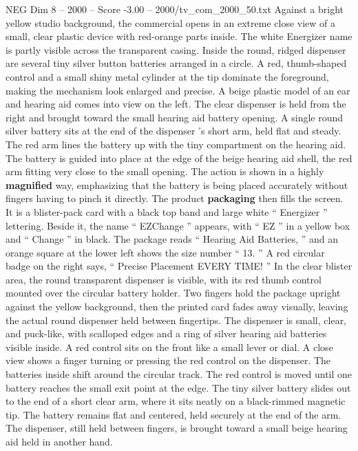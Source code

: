 \begin{textsample}{NEG Dim 8 – 2000 – Score -3.00 – 2000/tv\_com\_2000\_50.txt}  \label{ex:f8_neg_086}
Against a bright yellow studio background, the commercial opens in an extreme close view of a small, clear plastic device with red-orange parts inside.
The white Energizer name is partly visible across the transparent casing.
Inside the round, ridged dispenser are several tiny silver button batteries arranged in a circle.
A red, thumb-shaped control and a small shiny metal cylinder at the tip dominate the foreground, making the mechanism look enlarged and precise.
A beige plastic model of an ear and hearing aid comes into view on the left.
The clear dispenser is held from the right and brought toward the small hearing aid battery opening.
A single round silver battery sits at the end of the dispenser ’s short arm, held flat and steady.
The red arm lines the battery up with the tiny compartment on the hearing aid.
The battery is guided into place at the edge of the beige hearing aid shell, the red arm fitting very close to the small opening.
The action is shown in a highly \textbf{magnified} way, emphasizing that the battery is being placed accurately without fingers having to pinch it directly.
The product \textbf{packaging} then fills the screen.
It is a blister-pack card with a black top band and large white “ Energizer ” lettering.
Beside it, the name “ EZChange ” appears, with “ EZ ” in a yellow box and “ Change ” in black.
The package reads “ Hearing Aid Batteries, ” and an orange square at the lower left shows the size number “ 13. ” A red circular badge on the right says, “ Precise Placement EVERY TIME! ” In the clear blister area, the round transparent dispenser is visible, with its red thumb control mounted over the circular battery holder.
Two fingers hold the package upright against the yellow background, then the printed card fades away visually, leaving the actual round dispenser held between fingertips.
The dispenser is small, clear, and puck-like, with scalloped edges and a ring of silver hearing aid batteries visible inside.
A red control sits on the front like a small lever or dial.
A close view shows a finger turning or pressing the red control on the dispenser.
The batteries inside shift around the circular track.
The red control is moved until one battery reaches the small exit point at the edge.
The tiny silver battery slides out to the end of a short clear arm, where it sits neatly on a black-rimmed magnetic tip.
The battery remains flat and centered, held securely at the end of the arm.
The dispenser, still held between fingers, is brought toward a small beige hearing aid held in another hand.

\end{textsample}
